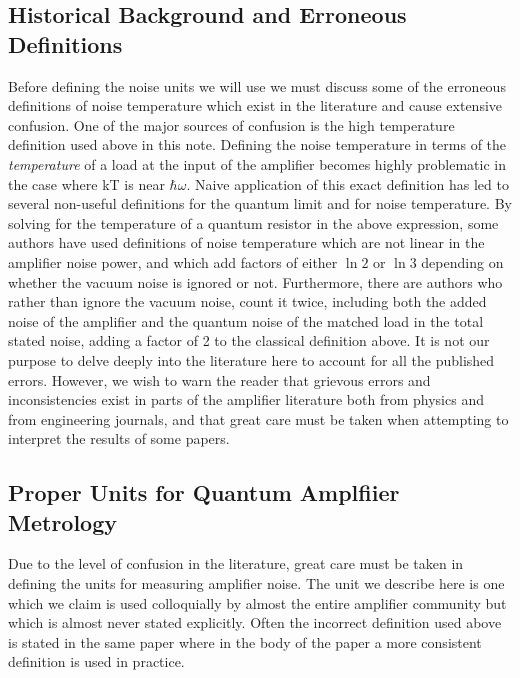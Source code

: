 \documentclass{report}
\begin{document}
	\subsection{Historical Background and Erroneous Definitions}

	Before defining the noise units we will use we must discuss some of the erroneous definitions of noise temperature which exist in the literature and cause extensive confusion.  One of the major sources of confusion is the high temperature definition used above in this note.  Defining the noise temperature in terms of the \textit{temperature} of a load at the input of the amplifier becomes highly problematic in the case where kT is near $\hbar\omega$.  Naive application of this exact definition has led to several non-useful definitions for the quantum limit and for noise temperature.  By solving for the temperature of a quantum resistor in the above expression, some authors have used definitions of noise temperature which are not linear in the amplifier noise power, and which add factors of either $\ln{2}$ or $\ln{3}$ depending on whether the vacuum noise is ignored or not.  Furthermore, there are authors who rather than ignore the vacuum noise, count it twice, including both the added noise of the amplifier and the quantum noise of the matched load in the total stated noise, adding a factor of 2 to the classical definition above.  It is not our purpose to delve deeply into the literature here to account for all the published errors.   However, we wish to warn the reader that grievous errors and inconsistencies exist in parts of the amplifier literature both from physics and from engineering journals, and that great care must be taken when attempting to interpret the results of some papers.  

	\subsection{Proper Units for Quantum Amplfiier Metrology}

	Due to the level of confusion in the literature, great care must be taken in defining the units for measuring amplifier noise.  The unit we describe here is one which we claim is used colloquially by almost the entire amplifier community but which is almost never stated explicitly.  Often the incorrect definition used above is stated in the same paper where in the body of the paper a more consistent definition is used in practice.  
\end{document}

